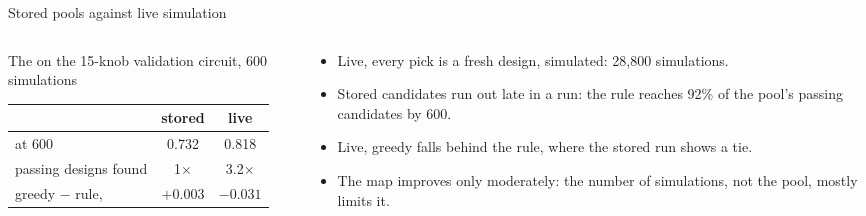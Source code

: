 \begin{frame}{Stored pools against live simulation}
  \begin{columns}[c]
    \begin{column}{0.5\textwidth}
      \centering\small
      The  on the 15-knob validation circuit, 600 simulations

      \vspace{2mm}
      \begin{tabular}{@{}lcc@{}}
        \toprule
        & stored & live \\
        \midrule
        \passfail{} at 600 & 0.732 & 0.818 \\
        passing designs found & 1$\times$ & 3.2$\times$ \\
        greedy $-$ rule, \passfail{} & $+0.003$ & $-0.031$ \\
        \bottomrule
      \end{tabular}
    \end{column}
    \begin{column}{0.47\textwidth}
      \small
      \begin{itemize}
        \item Live, every pick is a fresh design, simulated: 28,800 simulations.
        \item Stored candidates run out late in a run: the rule reaches 92\% of the pool's passing candidates by 600.
        \item Live, greedy falls behind the rule, where the stored run shows a tie.
        \item The map improves only moderately: the number of simulations, not the pool, mostly limits it.
      \end{itemize}
    \end{column}
  \end{columns}
\end{frame}

